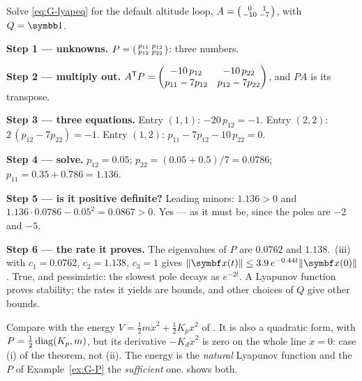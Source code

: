 \begin{example}
\label{ex:G-P}
Solve \cref{eq:G-lyapeq} for the default altitude loop, $A = \begin{psmallmatrix}0 & 1\\ -10 & -7\end{psmallmatrix}$, with $Q = \Id$.

\textbf{Step 1 — unknowns.} $P = \begin{psmallmatrix}p_{11} & p_{12}\\ p_{12} & p_{22}\end{psmallmatrix}$: three numbers.

\textbf{Step 2 — multiply out.} $A^{\mathsf{T}} P = \begin{pmatrix}-10\,p_{12} & -10\,p_{22}\\ p_{11} - 7p_{12} & p_{12} - 7p_{22}\end{pmatrix}$, and $PA$ is its transpose.

\textbf{Step 3 — three equations.} Entry $(1,1)$: $-20\,p_{12} = -1$. Entry $(2,2)$: $2\,(p_{12} - 7p_{22}) = -1$. Entry $(1,2)$: $p_{11} - 7p_{12} - 10\,p_{22} = 0$.

\textbf{Step 4 — solve.} $p_{12} = 0.05$; $p_{22} = (0.05 + 0.5)/7 = 0.0786$; $p_{11} = 0.35 + 0.786 = 1.136$.

\textbf{Step 5 — is it positive definite?} Leading minors: $1.136 > 0$ and $1.136 \cdot 0.0786 - 0.05^2 = 0.0867 > 0$. Yes — as it must be, since the poles are $-2$ and $-5$.

\textbf{Step 6 — the rate it proves.} The eigenvalues of $P$ are $0.0762$ and $1.138$. \,(iii) with $c_1 = 0.0762$, $c_2 = 1.138$, $c_3 = 1$ gives $\|\vx(t)\| \le 3.9\,e^{-0.44t}\|\vx(0)\|$. True, and pessimistic: the slowest pole decays as $e^{-2t}$. A Lyapunov function proves stability; the rates it yields are bounds, and other choices of $Q$ give other bounds.
\end{example}

Compare with the energy $V = \tfrac12m\dot x^2 + \tfrac12K_px^2$ of . It is also a quadratic form, with $P = \tfrac12\operatorname{diag}(K_p, m)$, but its derivative $-K_d\dot x^2$ is zero on the whole line $\dot x = 0$: case (i) of the theorem, not (ii). The energy is the \emph{natural} Lyapunov function and the $P$ of Example~\ref{ex:G-P} the \emph{sufficient} one.  shows both.


